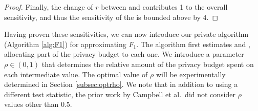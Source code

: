 \begin{proof}
Finally, the change of $r$ between \x and \xprime contributes 1 to the overall sensitivity, and thus the sensitivity of the \sa is bounded above by 4.
%
%
%
\end{proof}


Having proven these sensitivities, we can now introduce our private algorithm (Algorithm \ref{alg:F1}) for approximating $F_1$.  The algorithm first estimates \sa and \se, allocating part of the privacy budget to each one. We introduce a parameter $\rho \in (0,1)$ that determines the relative amount of the privacy budget spent on each intermediate value.  The optimal value of $\rho$ will be experimentally determined in Section \ref{subsec:optrho}.  We note that in addition to using a different test statistic, the prior work by Campbell et al.~did not consider $\rho$ values other than 0.5.

